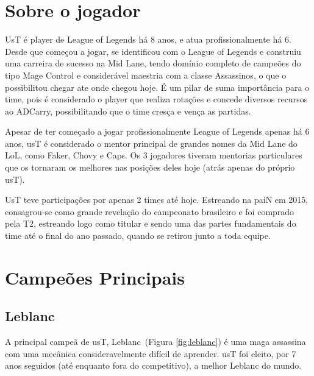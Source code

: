 \begin{multicols}{2}
	\section*{Sobre o jogador}  
	UsT é player de League of Legends há 8 anos, e atua profissionalmente há 6. Desde que começou a jogar, se identificou com o League of Legends e construiu uma carreira de sucesso na Mid Lane, tendo domínio completo de campeões do tipo Mage Control e considerável maestria com a classe Assassinos, o que o possibilitou chegar ate onde chegou hoje. É um pilar de suma importância para o time, pois é considerado o player que realiza rotações e concede diversos recursos ao ADCarry, possibilitando que o time cresça e vença as partidas.
	
	Apesar de ter começado a jogar profissionalmente League of Legends apenas há 6 anos, usT é considerado o mentor principal de grandes nomes da Mid Lane do LoL, como Faker, Chovy e Caps. Os 3 jogadores tiveram mentorias particulares que os tornaram os melhores nas posições deles hoje (atrás apenas do próprio usT).
	
	UsT teve participações por apenas 2 times até hoje. Estreando na paiN em 2015, consagrou-se como grande revelação do campeonato brasileiro e foi comprado pela T2, estreando logo como titular e sendo uma das partes fundamentais do time até o final do ano passado, quando se retirou junto a toda equipe.
	
	\section*{Campeões Principais}
	\subsection*{Leblanc}
	A principal campeã de usT, Leblanc~(Figura \ref{fig:leblanc}) é uma maga assassina com uma mecânica consideravelmente difícil de aprender. usT foi eleito, por 7 anos seguidos (até enquanto fora do competitivo), a melhor Leblanc do mundo.
	

\end{multicols}
